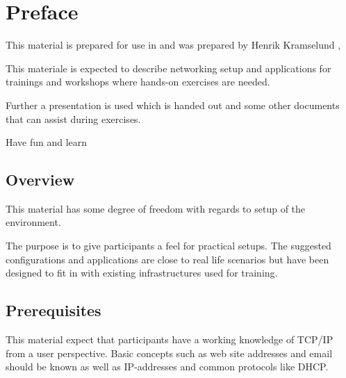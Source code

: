 \documentclass[a4paper,11pt,notitlepage]{report}
\begin{document}

\newcommand{\emne}[1]{hacker workshop}
\newcommand{\kursus}[1]{ethical hacker workshop}
\newcommand{\kursusnavn}[1]{ethical hacker workshop\\ exercises}





\setlength{\parskip}{0pt}

\setcounter{tocdepth}{0}

\normal

{\color{titlecolor}\tableofcontents}

\normal
\pagestyle{fancyplain}
\chapter*{\color{titlecolor}Preface}
This material is prepared for use in \emph{\kursus} and was prepared by
Henrik Kramselund  , 

This materiale is expected to describe networking setup and
applications for trainings and workshops where hands-on exercises are needed.

Further a presentation is used which is handed out and some other documents that can assist during exercises.

\vskip 1cm
Have fun and learn

\section*{\color{titlecolor}Overview}
\setlength{\parskip}{10pt}

This material has some degree of freedom with regards to setup of the environment.

The purpose is to give participants a feel for practical setups. The suggested configurations
and applications are close to real life scenarios but have been designed to fit in with existing infrastructures used for training.


\section*{\color{titlecolor}Prerequisites}

This material expect that participants have a working knowledge of
TCP/IP from a user perspective. Basic concepts such as web site addresses and email should be known as well as IP-addresses and common protocols like DHCP.
\end{document}
